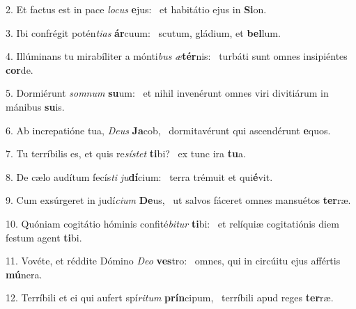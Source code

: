 2. Et factus est in pace \textit{lo}\textit{cus} \textbf{e}jus: \ast\  et habitátio ejus in \textbf{Si}on.\

3. Ibi confrégit potén\textit{ti}\textit{as} \textbf{ár}cuum: \ast\  scutum, gládium, et \textbf{bel}lum.\

4. Illúminans tu mirabíliter a mónti\textit{bus} \textit{æ}\textbf{tér}nis: \ast\  turbáti sunt omnes insipiéntes \textbf{cor}de.\

5. Dormiérunt \textit{som}\textit{num} \textbf{su}um: \ast\  et nihil invenérunt omnes viri divitiárum in mánibus \textbf{su}is.\

6. Ab increpatióne tua, \textit{De}\textit{us} \textbf{Ja}cob, \ast\  dormitavérunt qui ascendérunt \textbf{e}quos.\

7. Tu terríbilis es, et quis re\textit{sís}\textit{tet} \textbf{ti}bi? \ast\  ex tunc ira \textbf{tu}a.\

8. De cælo audítum fecís\textit{ti} \textit{ju}\textbf{dí}cium: \ast\  terra trémuit et qui\textbf{é}vit.\

9. Cum exsúrgeret in judí\textit{ci}\textit{um} \textbf{De}us, \ast\  ut salvos fáceret omnes mansuétos \textbf{ter}ræ.\

10. Quóniam cogitátio hóminis confité\textit{bi}\textit{tur} \textbf{ti}bi: \ast\  et relíquiæ cogitatiónis diem festum agent \textbf{ti}bi.\

11. Vovéte, et réddite Dómino \textit{De}\textit{o} \textbf{ves}tro: \ast\  omnes, qui in circúitu ejus affértis \textbf{mú}nera.\

12. Terríbili et ei qui aufert spí\textit{ri}\textit{tum} \textbf{prín}cipum, \ast\  terríbili apud reges \textbf{ter}ræ.\

